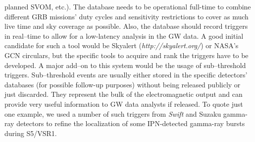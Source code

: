 planned SVOM, etc.). The database needs to be operational full-time to combine different GRB missions' duty cycles and sensitivity restrictions to cover as much live time and sky coverage as possible. Also, the database should record triggers in real--time to allow for a low-latency analysis in the GW data. A good initial candidate for such a tool would be Skyalert (\emph{http://skyalert.org/}) or NASA's GCN circulars, but the specific tools to acquire and rank the triggers have to be developed. A major add--on to this system would be the usage of sub--threshold triggers. Sub--threshold events are usually either stored in the specific detectors' databases (for possible follow-up purposes) without being released publicly or just discarded. They represent the bulk of the electromagnetic output and can provide very useful information to GW data analysts if released. To quote just one example, we used a number of such triggers from \emph{Swift} and Suzaku gamma-ray detectors to refine the localization of some IPN-detected gamma-ray bursts during S5/VSR1. 

